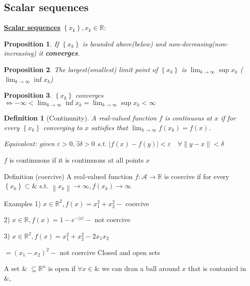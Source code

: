 \documentclass[11pt,a4paper]{article}
\newtheorem{definition}{Definition}
\newtheorem{proposition}{Proposition}
\begin{document}
\subsection{Scalar sequences}
\textbf{\underline{Scalar sequences}} $\left\{x_{k}\right\}, x_{k} \in \mathbb{R}$:
\begin{proposition}
    If $\left\{x_{k}\right\}$ is bounded above(below) and non-decreasing(non-increasing) it \textbf{converges}.
\end{proposition}

\begin{proposition}
    The largest(smallest) limit point of $\left\{x_{k}\right\}$ is $\lim _{k \rightarrow \infty}\sup x_{k}$ ($\lim _{k \rightarrow \infty}\inf x_{k}$)
\end{proposition}

\begin{proposition}
    $\left\{x_{k}\right\}$ converges $\Longleftrightarrow-\infty<\lim _{k \rightarrow \infty} \inf x_{k}=\lim _{k \rightarrow \infty}\sup x_{k}<\infty$
\end{proposition}

\begin{definition}[Continunity]
    A real-valued function $f$ is continuous at $x$ if for every $\left\{x_{k}\right\}$ converging to $x$ satisfies that $\lim _{k \rightarrow \infty} f\left(x_{k}\right)=f(x)$.
    
    Equivalent: given $\varepsilon>0, \exists \delta>0$ s.t.
    $|f(x)-f(y)|<\varepsilon \quad \forall\|y-x\|<\delta$
\end{definition}

$f$ is contimuons if it is contimuons at all points $x$

Definition (coercive) A real-valued function $f: \mathcal{A} \rightarrow \mathbb{R}$ is coercive if for every $\left\{x_{k}\right\} \subset \&$ s.t. $\left\|x_{k}\right\| \rightarrow \infty, f\left(x_{k}\right) \rightarrow \infty$

Examples 1) $x \in \mathbb{R}^{2}, f(x)=x_{1}^{2}+x_{2}^{2}-$ coercive

2) $x \in \mathbb{R}, f(x)=1-e^{-|x|}-$ not coercive

3) $x \in \mathbb{R}^{2}, f(x)=x_{1}^{2}+x_{2}^{2}-2 x_{1} x_{2}$

$=\left(x_{1}-x_{2}\right)^{2}-$ not coercive Closed and open sets

A set \& $\subseteq \mathbb{R}^{n}$ is open if $\forall x \in \&$ we can dran a ball around $x$ that is contanicd in $\&$,
\end{document}
